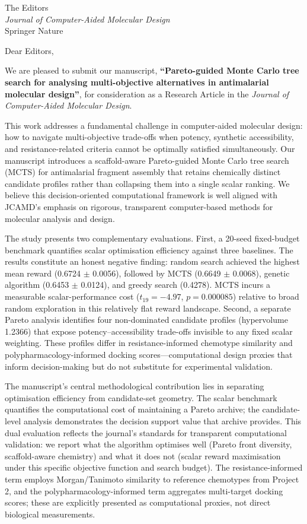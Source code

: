 \documentclass[10pt,a4paper]{letter}
\begin{document}
\begin{letter}{%
  The Editors \\
  \textit{Journal of Computer-Aided Molecular Design} \\
  Springer Nature
}

\opening{Dear Editors,}
\small
\setlength{\parskip}{0.35em}

We are pleased to submit our manuscript, \textbf{``Pareto-guided Monte Carlo tree search for analysing multi-objective alternatives in antimalarial molecular design''}, for consideration as a Research Article in the \textit{Journal of Computer-Aided Molecular Design}.

This work addresses a fundamental challenge in computer-aided molecular design: how to navigate multi-objective trade-offs when potency, synthetic accessibility, and resistance-related criteria cannot be optimally satisfied simultaneously. Our manuscript introduces a scaffold-aware Pareto-guided Monte Carlo tree search (MCTS) for antimalarial fragment assembly that retains chemically distinct candidate profiles rather than collapsing them into a single scalar ranking. We believe this decision-oriented computational framework is well aligned with JCAMD's emphasis on rigorous, transparent computer-based methods for molecular analysis and design.

The study presents two complementary evaluations. First, a \num{20}-seed fixed-budget benchmark quantifies scalar optimisation efficiency against three baselines. The results constitute an honest negative finding: random search achieved the highest mean reward (\num{0.6724} $\pm$ \num{0.0056}), followed by MCTS (\num{0.6649} $\pm$ \num{0.0068}), genetic algorithm (\num{0.6453} $\pm$ \num{0.0124}), and greedy search (\num{0.4278}). MCTS incurs a measurable scalar-performance cost ($t_{19} = -4.97$, $p = 0.000085$) relative to broad random exploration in this relatively flat reward landscape. Second, a separate Pareto analysis identifies four non-dominated candidate profiles (hypervolume \num{1.2366}) that expose potency--accessibility trade-offs invisible to any fixed scalar weighting. These profiles differ in resistance-informed chemotype similarity and polypharmacology-informed docking scores—computational design proxies that inform decision-making but do not substitute for experimental validation.

The manuscript's central methodological contribution lies in separating optimisation efficiency from candidate-set geometry. The scalar benchmark quantifies the computational cost of maintaining a Pareto archive; the candidate-level analysis demonstrates the decision support value that archive provides. This dual evaluation reflects the journal's standards for transparent computational validation: we report what the algorithm optimises well (Pareto front diversity, scaffold-aware chemistry) and what it does not (scalar reward maximisation under this specific objective function and search budget). The resistance-informed term employs Morgan/Tanimoto similarity to reference chemotypes from Project 2, and the polypharmacology-informed term aggregates multi-target docking scores; these are explicitly presented as computational proxies, not direct biological measurements.


\end{letter}
\end{document}
